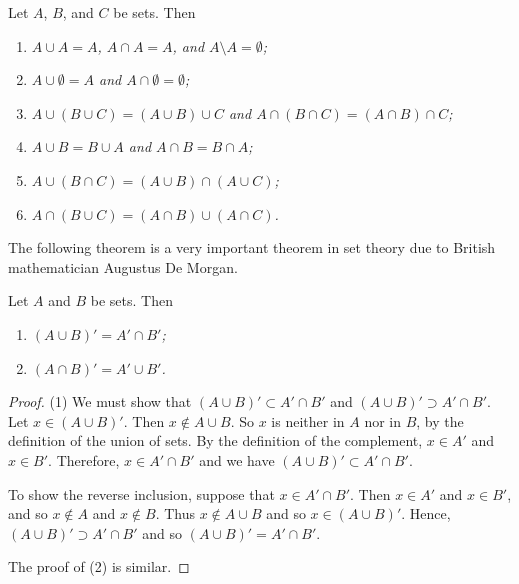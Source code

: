 \begin{proposition}
Let $A$, $B$, and $C$ be sets. Then
\begin{enumerate}

\rm\item\it
$A \cup A = A$, $A \cap A = A$, and $A \setminus A = \emptyset$;

\rm\item\it
$A \cup \emptyset = A$ and $A \cap \emptyset = \emptyset$;

\rm\item\it
$A \cup (B \cup C) = (A \cup B) \cup C$ and  $A \cap (B \cap C) = (A \cap B) \cap C$;

\rm\item\it
$A \cup B = B \cup A$ and $A \cap B = B \cap A$;

\rm\item\it
$A \cup (B \cap C) = (A \cup B) \cap (A \cup C)$;

\rm\item\it
$A \cap (B \cup C) = (A \cap B) \cup (A \cap C)$.

\end{enumerate}
\end{proposition}
The following theorem is a very important theorem in set theory due to British mathematician Augustus De Morgan.
\begin{theorem}
Let $A$ and $B$ be sets. Then
\begin{enumerate}

\rm\item\it
$(A \cup B)' = A' \cap B'$;

\rm\item\it
$(A \cap B)' = A' \cup B'$.

\end{enumerate}
\end{theorem}
\begin{proof}
(1)
We must show that $(A \cup B)' \subset A' \cap B'$ and $(A \cup B)' \supset A' \cap B'$. Let $x \in (A \cup B)'$.  Then $x \notin A \cup B$. So $x$ is neither in $A$ nor in $B$, by the definition of the union of sets.  By the definition of the complement, $x \in A'$ and $x \in B'$.  Therefore, $x \in A' \cap B'$ and we have $(A \cup B)' \subset A' \cap B'$.

To show the reverse inclusion, suppose that $x \in A' \cap B'$.  Then $x \in A'$ and $x \in B'$, and so $x \notin A$ and $x \notin B$.  Thus $x \notin A \cup B$ and so $x \in (A \cup B)'$.  Hence, $(A \cup B)' \supset A' \cap B'$ and so $(A \cup B)' = A' \cap B'$.

The proof of (2) is similar.
\end{proof}

